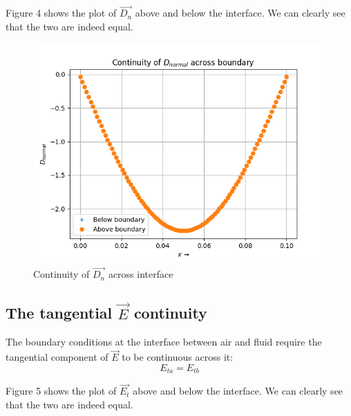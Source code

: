 \documentclass[11pt, a4paper, twoside]{report}
\begin{document}
            Figure 4 shows the plot of $\vec{D_n}$ above and below the interface. We can clearly see that the two are indeed equal.

            \begin{figure}[H]
                \centering
                \includegraphics[scale=0.75]{Fig4.png}
                \caption{Continuity of $\vec{D_n}$ across interface}
                \label{fig:Fig4}
            \end{figure}

        \subsection{The tangential $\vec{E}$ continuity}
            The boundary conditions at the interface between air and fluid require the tangential component of $\vec{E}$ to be continuous across it:
            \begin{equation}
                E_{ta} = E_{tb}
            \end{equation}

            Figure 5 shows the plot of $\vec{E_t}$ above and below the interface. We can clearly see that the two are indeed equal.
\end{document}
